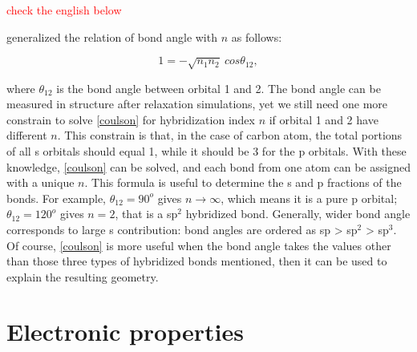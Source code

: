 {\huge \textcolor{red}{check the english below}}

\citet{coulson1949} generalized the relation of bond angle with $n$ as follows:

\begin{equation}\label{coulson}
1=-\sqrt{n_1n_2}~cos\theta_{12}, 
\end{equation}

where $\theta_{12}$ is the bond angle between orbital 1 and 2. The bond angle can be measured in structure after relaxation simulations, yet we still need one more constrain to solve \autoref{coulson} for hybridization index $n$ if orbital 1 and 2 have different $n$. This constrain is that, in the case of carbon atom, the total portions of all s orbitals should equal 1, while it should be 3 for the p orbitals. With these knowledge, \autoref{coulson} can be solved, and each bond from one atom can be assigned with a unique $n$. This formula is useful to determine the s and p fractions of the bonds. For example, $\theta_{12}=90^o$ gives $n\rightarrow\infty$, which means it is a pure p orbital; $\theta_{12}=120^o$ gives $n=2$, that is a sp$^2$ hybridized bond. Generally, wider bond angle corresponds to large s contribution: bond angles are ordered as sp > sp$^2$ > sp$^3$. Of course, \autoref{coulson} is more useful when the bond angle takes the values other than those three types of hybridized bonds mentioned, then it can be used to explain the resulting geometry.


\section{Electronic properties}

